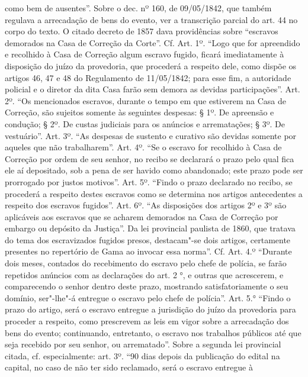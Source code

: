 {  como bem de ausentes''. Sobre o dec. nº 160, de 09/05/1842, que também
  regulava a arrecadação de bens do evento, ver a transcrição parcial do
  art. 44 no corpo do texto. O citado decreto de 1857 dava providências
  sobre ``escravos demorados na Casa de Correção da Corte''. Cf. Art.
  1º. ``Logo que for apreendido e recolhido à Casa de Correção algum
  escravo fugido, ficará imediatamente à disposição do juízo da
  provedoria, que procederá a respeito dele, como dispõe os artigos 46,
  47 e 48 do Regulamento de 11/05/1842; para esse fim, a autoridade
  policial e o diretor da dita Casa farão sem demora as devidas
  participações''. Art. 2º. ``Os mencionados escravos, durante o tempo em
  que estiverem na Casa de Correção, são sujeitos somente às seguintes
  despesas: § 1º. De apreensão e condução; § 2º. De custas judiciais
  para os anúncios e arrematações; § 3º. De vestuário''. Art. 3º. ``As
  despesas de sustento e curativo são devidas somente por aqueles que
  não trabalharem''. Art. 4º. ``Se o escravo for recolhido à Casa de
  Correção por ordem de seu senhor, no recibo se declarará o prazo pelo
  qual fica ele aí depositado, sob a pena de ser havido como abandonado;
  este prazo pode ser prorrogado por justos motivos''. Art. 5º. ``Findo o
  prazo declarado no recibo, se procederá a respeito destes escravos
  como se determina nos artigos antecedentes a respeito dos escravos
  fugidos''. Art. 6º. ``As disposições dos artigos 2º e 3º são aplicáveis
  aos escravos que se acharem demorados na Casa de Correção por embargo
  ou depósito da Justiça''. Da lei provincial paulista de 1860, que
  tratava do tema dos escravizados fugidos presos, destacam"-se dois
  artigos, certamente presentes no repertório de Gama ao invocar essa
  norma''. Cf. Art. 4.º ``Durante dois meses, contados do recebimento do
  escravo pelo chefe de polícia, se farão repetidos anúncios com as
  declarações do art. 2 °, e outras que acrescerem, e comparecendo o
  senhor dentro deste prazo, mostrando satisfatoriamente o seu domínio,
  ser"-lhe"-á entregue o escravo pelo chefe de polícia''. Art. 5.° ``Findo o
  prazo do artigo, será o escravo entregue a jurisdição do juízo da
  provedoria para proceder a respeito, como prescrevem as leis em vigor
  sobre a arrecadação dos bens do evento; continuando, entretanto, o
  escravo nos trabalhos públicos até que seja recebido por seu senhor,
  ou arrematado''. Sobre a segunda lei provincial citada, cf.
  especialmente: art. 3º. ``90 dias depois da publicação do edital na
  capital, no caso de não ter sido reclamado, será o escravo entregue à
}
